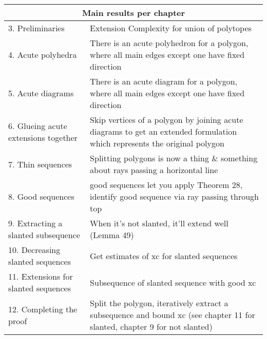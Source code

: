 \begin{tabular}{| p{50mm} | p{100mm} |}
  \hline
  \multicolumn{2}{|c|}{\textbf{Main results per chapter}}\\ \hline
  3. Preliminaries & Extension Complexity for union of polytopes \\ \hline
  4. Acute polyhedra & There is an acute polyhedron for a polygon, where all main edges except one have fixed direction \\ \hline
  5. Acute diagrams & There is an acute diagram for a polygon, where all main edges except one have fixed direction \\ \hline
  6. Glueing acute extensions together & Skip vertices of a polygon by joining acute diagrams to get an extended formulation which represents the original polygon \\ \hline
  7. Thin sequences & Splitting polygons is now a thing \& something about rays passing a horizontal line \\ \hline
  8. Good sequences & good sequences let you apply Theorem 28, identify good sequence via ray passing through top \\ \hline
  9. Extracting a slanted subsequence & When it's not slanted, it'll extend well (Lemma 49) \\ \hline
  10. Decreasing slanted sequences & Get estimates of xc for slanted sequences \\ \hline
  11. Extensions for slanted sequences & Subsequence of slanted sequence with good xc \\ \hline
  12. Completing the proof & Split the polygon, iteratively extract a subsequence and bound xc (see chapter 11 for slanted, chapter 9 for not slanted) \\ \hline
\end{tabular}
